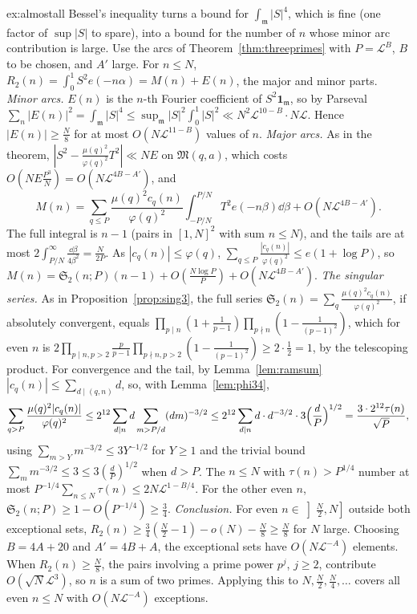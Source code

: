 \begin{solution}{ex:almostall}
\idea Bessel's inequality turns a bound for $\int_{\mathfrak m}|S|^4$, which is fine (one factor of $\sup|S|$ to spare), into a bound for the number of $n$ whose minor arc contribution is large.
\writeup Use the arcs of Theorem~\ref{thm:threeprimes} with $P=\mathcal L^B$, $B$ to be chosen, and $A'$ large. For $n\le N$, $R_2(n)=\int_0^1S^2e(-n\alpha)=M(n)+E(n)$, the major and minor parts.
\emph{Minor arcs.} $E(n)$ is the $n$-th Fourier coefficient of $S^2\mathbf 1_{\mathfrak m}$, so by Parseval $\sum_{n}|E(n)|^2=\int_{\mathfrak m}|S|^4\le\sup_{\mathfrak m}|S|^2\int_0^1|S|^2\ll N^2\mathcal L^{10-B}\cdot N\mathcal L$. Hence $|E(n)|\ge\frac N8$ for at most $O(N\mathcal L^{11-B})$ values of $n$.
\emph{Major arcs.} As in the theorem, $|S^2-\frac{\mu(q)^2}{\varphi(q)^2}T^2|\ll NE$ on $\mathfrak M(q,a)$, which costs $O(NE\frac{P^3}N)=O(N\mathcal L^{4B-A'})$, and
\[
M(n)=\sum_{q\le P}\frac{\mu(q)^2c_q(n)}{\varphi(q)^2}\int_{-P/N}^{P/N}T^2e(-n\beta)\dd\beta+O(N\mathcal L^{4B-A'}).
\]
The full integral is $n-1$ (pairs in $[1,N]^2$ with sum $n\le N$), and the tails are at most $2\int_{P/N}^\infty\frac{\dd\beta}{4\beta^2}=\frac N{2P}$. As $|c_q(n)|\le\varphi(q)$, $\sum_{q\le P}\frac{|c_q(n)|}{\varphi(q)^2}\le e(1+\log P)$, so $M(n)=\mathfrak S_2(n;P)(n-1)+O(\frac{N\log P}P)+O(N\mathcal L^{4B-A'})$.
\emph{The singular series.} As in Proposition~\ref{prop:sing3}, the full series $\mathfrak S_2(n)=\sum_q\frac{\mu(q)^2c_q(n)}{\varphi(q)^2}$, if absolutely convergent, equals $\prod_{p\mid n}(1+\frac1{p-1})\prod_{p\nmid n}(1-\frac1{(p-1)^2})$, which for even $n$ is $2\prod_{p\mid n,p>2}\frac p{p-1}\prod_{p\nmid n,p>2}(1-\frac1{(p-1)^2})\ge2\cdot\frac12=1$, by the telescoping product. For convergence and the tail, by Lemma~\ref{lem:ramsum} $|c_q(n)|\le\sum_{d\mid(q,n)}d$, so, with Lemma~\ref{lem:phi34},
\[
\sum_{q>P}\frac{\mu(q)^2|c_q(n)|}{\varphi(q)^2}\le2^{12}\sum_{d\mid n}d\sum_{m>P/d}(dm)^{-3/2}\le2^{12}\sum_{d\mid n}d\cdot d^{-3/2}\cdot3\Bigl(\frac dP\Bigr)^{1/2}=\frac{3\cdot2^{12}\tau(n)}{\sqrt P},
\]
using $\sum_{m>Y}m^{-3/2}\le3Y^{-1/2}$ for $Y\ge1$ and the trivial bound $\sum_mm^{-3/2}\le3\le3(\frac dP)^{1/2}$ when $d>P$. The $n\le N$ with $\tau(n)>P^{1/4}$ number at most $P^{-1/4}\sum_{n\le N}\tau(n)\le2N\mathcal L^{1-B/4}$. For the other even $n$, $\mathfrak S_2(n;P)\ge1-O(P^{-1/4})\ge\frac34$.
\emph{Conclusion.} For even $n\in\left]\frac N2,N\right]$ outside both exceptional sets, $R_2(n)\ge\frac34(\frac N2-1)-o(N)-\frac N8\ge\frac N8$ for $N$ large. Choosing $B=4A+20$ and $A'=4B+A$, the exceptional sets have $O(N\mathcal L^{-A})$ elements. When $R_2(n)\ge\frac N8$, the pairs involving a prime power $p^j$, $j\ge2$, contribute $O(\sqrt N\mathcal L^3)$, so $n$ is a sum of two primes. Applying this to $N,\frac N2,\frac N4,\dots$ covers all even $n\le N$ with $O(N\mathcal L^{-A})$ exceptions.
\end{solution}

